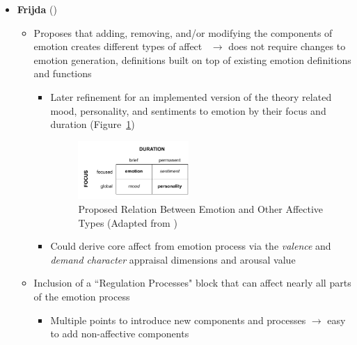 \begin{itemize}
    \item \textbf{Frijda} (\strong)
    \begin{itemize}
        \item Proposes that adding, removing, and/or modifying the components of
        emotion creates different types of
        affect~\citep[p.~253]{frijda1986emotions} $\rightarrow$ does not
        require changes to emotion generation, definitions built on top of
        existing emotion definitions and functions
        \begin{itemize}
            \item Later refinement for an implemented version of the theory
            related mood, personality, and sentiments to emotion by their focus
            and duration (Figure~\ref{fig:CRAffectTypes})
            \begin{figure}[!b]
                \centering
                \includegraphics[width=0.45\textwidth]{figures/CR_affectTypes.pdf}

                \caption[Proposed Relation Between Emotion and Other Affective
                Types]{Proposed Relation Between Emotion and Other Affective
                Types (Adapted from \citet[p.~136]{moffat1997personality})}
                \label{fig:CRAffectTypes}
            \end{figure}

            \item Could derive core affect from emotion process via the
            \textit{valence} and \textit{demand character} appraisal
            dimensions and arousal value~\citep[p.~207,
            454]{frijda1986emotions}
        \end{itemize}

        \item Inclusion of a ``Regulation Processes" block that can affect
        nearly all parts of the emotion
        process~\citep[p.~545]{frijda1986emotions}
        \begin{itemize}
            \item Multiple points to introduce new components and processes
            $\rightarrow$ easy to add non-affective components


\end{itemize}
\end{itemize}
\end{itemize}
